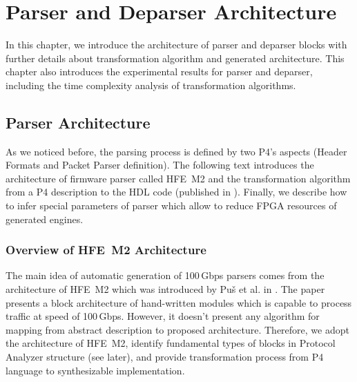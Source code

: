 \chapter{Parser and Deparser Architecture}
\label{chap:parserDeparserArchitecture}

\begin{chapterintro}
In this chapter, we introduce the architecture of parser and deparser blocks with further details about transformation algorithm 
and generated architecture.
This chapter also introduces the experimental results for parser and deparser, including the time complexity analysis of transformation algorithms. 
\end{chapterintro}

\section{Parser Architecture}
\label{sec:parserArch}
As we noticed before, the parsing process is defined by two P4's aspects (Header Formats and Packet Parser definition). 
The following text introduces the architecture of firmware parser called HFE~M2 \cite{hfem2} 
and the transformation algorithm from a P4 description to the HDL code 
(published in \cite{2016fccm-p4-parser,2015h2rc-p4-parser,2016pesw,2016stanford-p4-demo}). 
Finally, we describe how to infer special parameters of parser which allow to reduce FPGA resources of generated engines. 

\subsection{Overview of HFE~M2 Architecture} 
\label{sec:overviewOfHfeM2}
 
The main idea of automatic generation of 100\,Gbps parsers comes from the architecture of HFE~M2 which was introduced by
Pu\v{s} et al. in \cite{hfem2}. The paper presents a block architecture of hand-written modules which 
is capable to process traffic at speed of 100\,Gbps.
However, it doesn't present any algorithm for mapping from abstract description to proposed architecture.
Therefore, we adopt the architecture of HFE~M2, identify fundamental types of blocks in Protocol Analyzer structure (see later), 
and provide transformation process from P4 language to synthesizable implementation.

